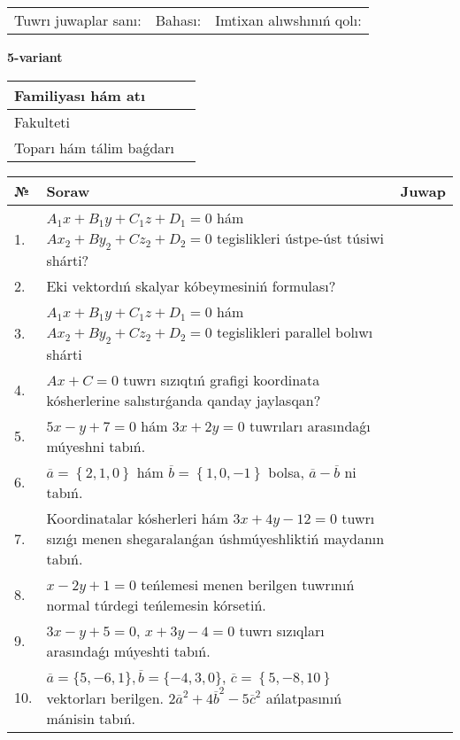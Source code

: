 \documentclass{article}
\begin{document}
\vspace{1cm}

\begin{tabular}{lll}
Tuwrı juwaplar sanı: \underline{\hspace{1.5cm}} & 
Bahası: \underline{\hspace{1.5cm}} & 
Imtixan alıwshınıń qolı: \underline{\hspace{2cm}} \\
\end{tabular}

\egroup

\newpage


\textbf{5-variant}\\

\bgroup
\def\arraystretch{1.6} %

\begin{tabular}{|m{5.7cm}|m{9.5cm}|}
\hline
Familiyası hám atı & \\
\hline
Fakulteti  & \\
\hline
Toparı hám tálim baǵdarı  & \\
\hline
\end{tabular}

\vspace{1cm}

\begin{tabular}{|m{0.7cm}|m{10cm}|m{4cm}|}
\hline
№ & Soraw & Juwap \\
\hline
1. & $A_1x+B_1y+C_1z+D_1=0$ hám $Ax_2+By_2+Cz_2+D_2=0$ tegislikleri ústpe-úst túsiwi shárti? &  \\
\hline
2. & Eki vektordıń skalyar kóbeymesiniń formulası? &  \\
\hline
3. & $A_1x+B_1y+C_1z+D_1=0$ hám $Ax_2+By_2+Cz_2+D_2=0$ tegislikleri parallel bolıwı shárti &  \\
\hline
4. & $Ax+C=0$ tuwrı sızıqtıń grafigi koordinata kósherlerine salıstırǵanda qanday jaylasqan? &  \\
\hline
5. & $5x-y+7=0$ hám $3x+2y=0$ tuwrıları arasındaǵı múyeshni tabıń. &  \\
\hline
6. & $\overline{a}=\left\{ 2, 1, 0 \right\}$ hám $\overline{b}=\left\{ 1, 0,-1 \right\}$ bolsa, $\overline{a}-\overline{b}$ ni tabıń. &  \\
\hline
7. & Koordinatalar kósherleri hám $ 3x+4y-12=0 $ tuwrı sızıǵı menen shegaralanǵan úshmúyeshliktiń maydanın tabıń. &  \\
\hline
8. & $x-2y+1=0$ teńlemesi menen berilgen tuwrınıń normal túrdegi teńlemesin kórsetiń. &  \\
\hline
9. & $3x-y+5=0$, $x+3y-4=0$ tuwrı sızıqları arasındaǵı múyeshti tabıń. &  \\
\hline
10. & $\overline{a}=\{5,-6, 1 \}, \overline{b}=\{-4, 3, 0 \} $, $\overline{c}=\left\{ 5,-8, 10 \right\}$ vektorları berilgen. $2{\overline{a}}^{2}+4{\overline{b}}^{2}-5{\overline{c}}^{2}$ ańlatpasınıń mánisin tabıń. &  \\
\hline
\end{tabular}
\end{document}
